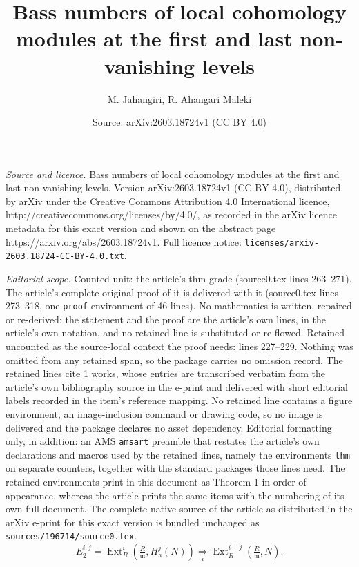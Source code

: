 \documentclass[10pt,a4paper]{amsart}
\title{Bass numbers of local cohomology modules at the first and last non-vanishing levels}
\author{M. Jahangiri, R. Ahangari Maleki}
\date{Source: arXiv:2603.18724v1 (CC BY 4.0)}
\def\Ext{\operatorname{Ext}}
\newcommand{\fa}{\mathfrak{a}}
\newcommand{\m}{\mathfrak{m}}
\begin{document}
\maketitle

\noindent\emph{Source and licence.} Bass numbers of local cohomology modules at the first and last non-vanishing levels. Version arXiv:2603.18724v1 (CC BY 4.0), distributed by arXiv under the Creative Commons Attribution 4.0 International licence, http://creativecommons.org/licenses/by/4.0/, as recorded in the arXiv licence metadata for this exact version and shown on the abstract page https://arxiv.org/abs/2603.18724v1. Full licence notice: \texttt{licenses/arxiv-2603.18724-CC-BY-4.0.txt}.\par\smallskip

\noindent\textit{Editorial scope.} Counted unit: the article's thm grade (source0.tex lines 263--271). The article's complete original proof of it is delivered with it (source0.tex lines 273--318, one \texttt{proof} environment of 46 lines). No mathematics is written, repaired or re-derived: the statement and the proof are the article's own lines, in the article's own notation, and no retained line is substituted or re-flowed.  Retained uncounted as the source-local context the proof needs: lines 227--229.  Nothing was omitted from any retained span, so the package carries no omission record.  The retained lines cite 1 works, whose entries are transcribed verbatim from the article's own bibliography source in the e-print and delivered with short editorial labels recorded in the item's reference mapping.  No retained line contains a figure environment, an image-inclusion command or drawing code, so no image is delivered and the package declares no asset dependency.  Editorial formatting only, in addition: an AMS \texttt{amsart} preamble that restates the article's own declarations and macros used by the retained lines, namely the environments \texttt{thm} on separate counters, together with the standard packages those lines need.  The retained environments print in this document as Theorem 1 in order of appearance, whereas the article prints the same items with the numbering of its own full document.  The complete native source of the article as distributed in the arXiv e-print for this exact version is bundled unchanged as \texttt{sources/196714/source0.tex}.
\begin{equation}\label{1}
     E_2^{i, j}= \Ext^i_{R }(\tfrac{R}{\m}, H^j_{\fa}(N))\underset{i}{\Rightarrow}\Ext^{i+ j}_{R}(\tfrac{R}{\m}, N).
\end{equation}
\end{document}
